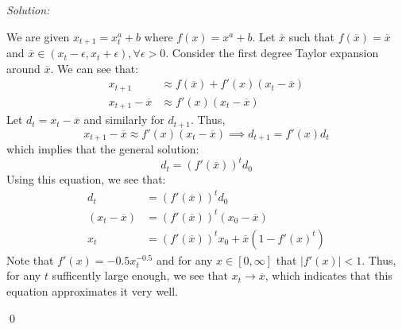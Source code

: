 \documentclass[12pt]{article}
\newenvironment{problem}[2][Problem]{\begin{trivlist}
\item[\hskip \labelsep {\bfseries #1}\hskip \labelsep {\bfseries #2.}]}{\end{trivlist}}
\newenvironment{sol}
    {\emph{Solution:}
    }
    {
    \qed
    }
\newenvironment{subsol}
    {\emph{Solution:}
    }
    {
    \qed
    }
\begin{document}
\begin{subsol}
    We are given $x_{t+1} = x_t^a + b$ where $f(x) = x^a + b$. Let $\overline{x}$ such that $f(\overline{x}) = \overline{x}$ and $\overline{x} \in (x_t - \epsilon, x_t + \epsilon), \forall \epsilon >0 $. Consider the first degree Taylor expansion around $\overline{x}$. We can see that:
    \begin{align*}
        x_{t+1} &\approx f(\overline{x}) + f'(x)(x_t-\overline{x})\\
        x_{t+1} - \overline{x} &\approx f'(x)(x_t - \overline{x})
    \end{align*}
    Let $d_{t} = x_{t} - \overline{x}$ and similarly for $d_{t+1}$. Thus, 
    \[
        x_{t+1} - \overline{x} \approx f'(x)(x_t - \overline{x}) \implies d_{t+1} = f'(x)d_t
    \]
    which implies that the general solution:
    \[
    d_t = (f'(\overline{x}))^t d_0
    \]
    Using this equation, we see that:
    \begin{align*}
        d_t &= (f'(\overline{x}))^t d_0\\ 
        (x_t - \overline{x}) &= (f'(\overline{x}))^t(x_0 - \overline{x})\\
        x_t &= (f'(\overline{x}))^t x_0 + \overline{x}(1-f'(x)^t)
    \end{align*}
    Note that $f'(x) = -0.5x_t^{-0.5}$ and for any $x \in [0, \infty]$ that $|f'(x)| < 1$. Thus, for any $t$ sufficently large enough, we see that $x_t \to \overline{x}$, which indicates that this equation approximates it very well. 
\end{subsol}

\end{document}
